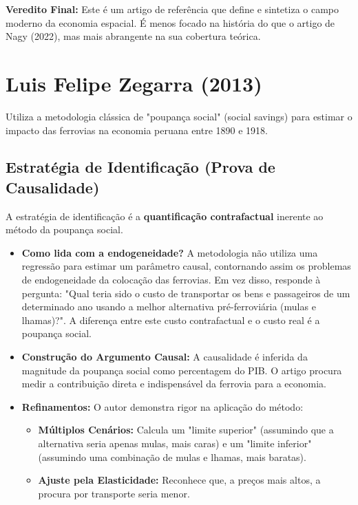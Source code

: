 \documentclass[12pt, a4paper]{article}
\begin{document}
\noindent\textbf{Veredito Final:} Este é um artigo de referência que define e sintetiza o campo moderno da economia espacial. É menos focado na história do que o artigo de Nagy (2022), mas mais abrangente na sua cobertura teórica.

\section{Luis Felipe Zegarra (2013)}
Utiliza a metodologia clássica de "poupança social" (social savings) para estimar o impacto das ferrovias na economia peruana entre 1890 e 1918.

\subsection{Estratégia de Identificação (Prova de Causalidade)}
A estratégia de identificação é a \textbf{quantificação contrafactual} inerente ao método da poupança social.

\begin{itemize}
    \item \textbf{Como lida com a endogeneidade?} A metodologia não utiliza uma regressão para estimar um parâmetro causal, contornando assim os problemas de endogeneidade da colocação das ferrovias. Em vez disso, responde à pergunta: "Qual teria sido o custo de transportar os bens e passageiros de um determinado ano usando a melhor alternativa pré-ferroviária (mulas e lhamas)?". A diferença entre este custo contrafactual e o custo real é a poupança social.
    \item \textbf{Construção do Argumento Causal:} A causalidade é inferida da magnitude da poupança social como percentagem do PIB. O artigo procura medir a contribuição direta e indispensável da ferrovia para a economia.
    \item \textbf{Refinamentos:} O autor demonstra rigor na aplicação do método:
        \begin{itemize}
            \item \textbf{Múltiplos Cenários:} Calcula um "limite superior" (assumindo que a alternativa seria apenas mulas, mais caras) e um "limite inferior" (assumindo uma combinação de mulas e lhamas, mais baratas).
            \item \textbf{Ajuste pela Elasticidade:} Reconhece que, a preços mais altos, a procura por transporte seria menor. 
        \end{itemize}
\end{itemize}
\end{document}
